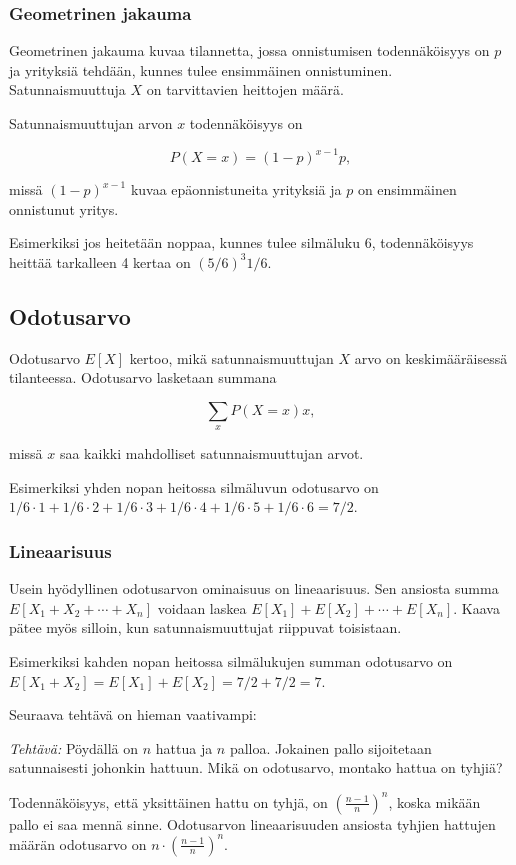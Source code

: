 \subsubsection*{Geometrinen jakauma}

Geometrinen jakauma kuvaa tilannetta,
jossa onnistumisen todennäköisyys on $p$
ja yrityksiä tehdään, kunnes tulee ensimmäinen
onnistuminen. Satunnaismuuttuja $X$ on
tarvittavien heittojen määrä.

Satunnaismuuttujan arvon $x$ todennäköisyys on

\[P(X=x)=(1-p)^{x-1} p,\]

missä $(1-p)^{x-1}$ kuvaa epäonnistuneita yrityksiä ja
$p$ on ensimmäinen onnistunut yritys.

Esimerkiksi jos heitetään noppaa,
kunnes tulee silmäluku 6, todennäköisyys
heittää tarkalleen 4 kertaa on $(5/6)^3 1/6$.

\subsection{Odotusarvo}

Odotusarvo $E[X]$ kertoo, mikä satunnaismuuttujan $X$
arvo on keskimääräisessä tilanteessa.
Odotusarvo lasketaan summana

\[\sum_x P(X=x)x,\]

missä $x$ saa kaikki mahdolliset satunnaismuuttujan arvot.

Esimerkiksi yhden nopan heitossa silmäluvun odotusarvo
on $1/6 \cdot 1 + 1/6 \cdot 2 + 1/6 \cdot 3 + 1/6 \cdot 4 + 1/6 \cdot 5 + 1/6 \cdot 6 = 7/2$.

\subsubsection*{Lineaarisuus}

Usein hyödyllinen odotusarvon ominaisuus on lineaarisuus.
Sen ansiosta summa $E[X_1+X_2+\cdots+X_n]$ voidaan laskea $E[X_1]+E[X_2]+\cdots+E[X_n]$.
Kaava pätee myös silloin, kun satunnaismuuttujat riippuvat toisistaan.

Esimerkiksi kahden nopan heitossa silmälukujen summan odotusarvo on
$E[X_1+X_2]=E[X_1]+E[X_2]=7/2+7/2=7$.

Seuraava tehtävä on hieman vaativampi:

\textit{Tehtävä:} Pöydällä on $n$ hattua ja $n$ palloa.
Jokainen pallo sijoitetaan satunnaisesti johonkin hattuun.
Mikä on odotusarvo, montako hattua on tyhjiä?

Todennäköisyys, että yksittäinen hattu on tyhjä,
on $(\frac{n-1}{n})^n$, koska mikään pallo ei saa mennä sinne.
Odotusarvon lineaarisuuden ansiosta tyhjien hattujen
määrän odotusarvo on $n \cdot (\frac{n-1}{n})^n$.

